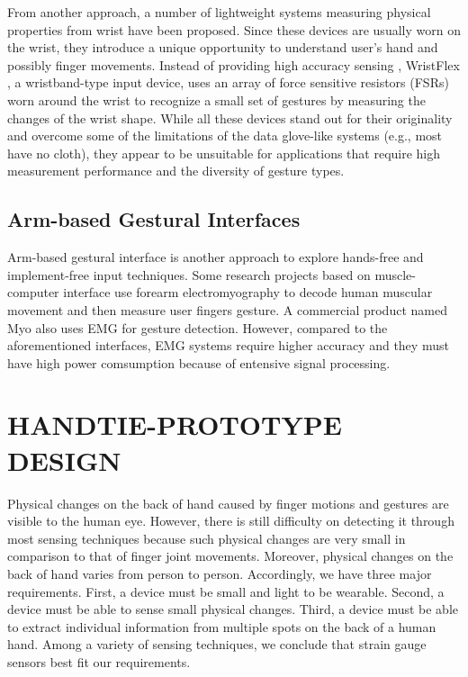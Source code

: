 \documentclass{sigchi}
\begin{document}
From another approach, a number of lightweight systems measuring physical properties from wrist have been proposed. Since these devices are usually worn on the wrist, they introduce a unique opportunity to understand user's hand and possibly finger movements. Instead of providing high accuracy sensing , WristFlex \cite{Dementyev:2014:WLG:2642918.2647396}, a wristband-type input device, uses an array of force sensitive resistors (FSRs) worn around the wrist to recognize a small set of gestures by measuring the changes of the wrist shape. While all these devices stand out for their originality and overcome some of the limitations of the data glove-like systems (e.g., most have no cloth), they appear to be unsuitable for applications that require high measurement performance and the diversity of gesture types.


\subsection{Arm-based Gestural Interfaces}

Arm-based gestural interface is another approach to explore hands-free and implement-free input techniques. Some research projects based on muscle-computer interface \cite{Saponas:2009:EAI:1622176.1622208} use forearm electromyography to decode human muscular movement and then measure user fingers gesture. A commercial product named Myo also uses EMG for gesture detection. However, compared to the aforementioned interfaces, EMG systems require higher accuracy and they must have high power comsumption because of entensive signal processing.  



\section{HANDTIE-PROTOTYPE DESIGN}

Physical changes on the back of hand caused by finger motions and gestures are visible to the human eye. However, there is still difficulty on detecting it through most sensing techniques because such physical changes are very small in comparison to that of finger joint movements. Moreover, physical changes on the back of hand varies from person to person. Accordingly, we have three major requirements. First, a device must be small and light to be wearable. Second, a device must be able to sense small physical changes. Third, a device must be able to extract individual information from multiple spots on the back of a human hand. Among a variety of sensing techniques, we conclude that strain gauge sensors best fit our requirements.
\end{document}
